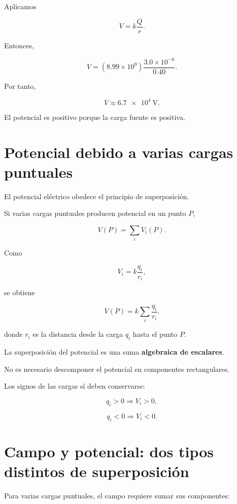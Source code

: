Aplicamos

\[
V=k\frac{Q}{r}.
\]

Entonces,

\[
V
=
(8.99\times10^9)
\frac{3.0\times10^{-6}}{0.40}.
\]

Por tanto,

\[
\boxed{
V\approx\SI{6.7e4}{\volt}
}.
\]

El potencial es positivo porque la carga fuente es positiva.


\section{Potencial debido a varias cargas puntuales}

El potencial eléctrico obedece el principio de superposición.

Si varias cargas puntuales producen potencial en un punto \(P\),

\begin{equation}
\boxed{
V(P)=\sum_iV_i(P)
}.
\end{equation}

Como

\[
V_i=k\frac{q_i}{r_i},
\]

se obtiene

\begin{equation}
\boxed{
V(P)=k\sum_i\frac{q_i}{r_i}
}.
\end{equation}

donde \(r_i\) es la distancia desde la carga \(q_i\) hasta el punto \(P\).

\begin{idea}

La superposición del potencial es una suma \textbf{algebraica de escalares}.

No es necesario descomponer el potencial en componentes rectangulares.

\end{idea}

Los signos de las cargas sí deben conservarse:

\[
q_i>0\Longrightarrow V_i>0,
\]

\[
q_i<0\Longrightarrow V_i<0.
\]


\section{Campo y potencial: dos tipos distintos de superposición}

Para varias cargas puntuales, el campo requiere sumar sus componentes:

